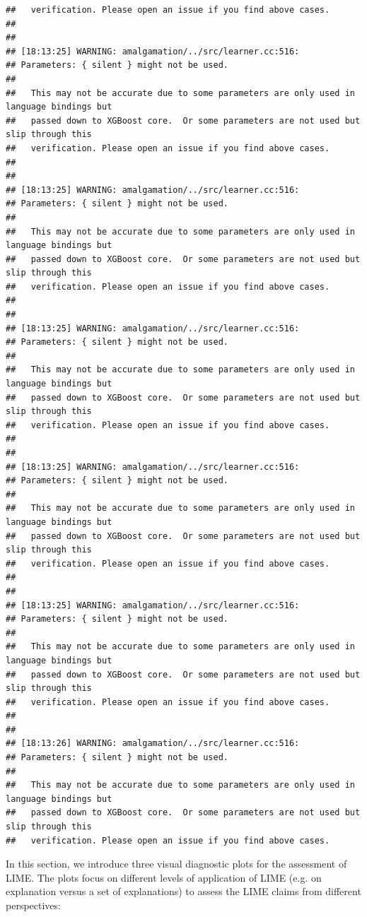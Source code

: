 \documentclass[AMS,STIX2COL]{WileyNJD-v2}\usepackage[]{graphicx}\usepackage[]{color}
\makeatletter
\newenvironment{kframe}{%
 \def\at@end@of@kframe{}%
 \ifinner\ifhmode%
  \def\at@end@of@kframe{\end{minipage}}%
  \begin{minipage}{\columnwidth}%
 \fi\fi%
 \def\FrameCommand##1{\hskip\@totalleftmargin \hskip-\fboxsep
 \colorbox{shadecolor}{##1}\hskip-\fboxsep
     \hskip-\linewidth \hskip-\@totalleftmargin \hskip\columnwidth}%
 \MakeFramed {\advance\hsize-\width
   \@totalleftmargin\z@ \linewidth\hsize
   \@setminipage}}%
 {\par\unskip\endMakeFramed%
 \at@end@of@kframe}
\newenvironment{knitrout}{}{} %
\makeatother
\begin{document}
\begin{knitrout}
\begin{kframe}
\begin{verbatim}
##   verification. Please open an issue if you find above cases.
## 
## 
## [18:13:25] WARNING: amalgamation/../src/learner.cc:516: 
## Parameters: { silent } might not be used.
## 
##   This may not be accurate due to some parameters are only used in language bindings but
##   passed down to XGBoost core.  Or some parameters are not used but slip through this
##   verification. Please open an issue if you find above cases.
## 
## 
## [18:13:25] WARNING: amalgamation/../src/learner.cc:516: 
## Parameters: { silent } might not be used.
## 
##   This may not be accurate due to some parameters are only used in language bindings but
##   passed down to XGBoost core.  Or some parameters are not used but slip through this
##   verification. Please open an issue if you find above cases.
## 
## 
## [18:13:25] WARNING: amalgamation/../src/learner.cc:516: 
## Parameters: { silent } might not be used.
## 
##   This may not be accurate due to some parameters are only used in language bindings but
##   passed down to XGBoost core.  Or some parameters are not used but slip through this
##   verification. Please open an issue if you find above cases.
## 
## 
## [18:13:25] WARNING: amalgamation/../src/learner.cc:516: 
## Parameters: { silent } might not be used.
## 
##   This may not be accurate due to some parameters are only used in language bindings but
##   passed down to XGBoost core.  Or some parameters are not used but slip through this
##   verification. Please open an issue if you find above cases.
## 
## 
## [18:13:25] WARNING: amalgamation/../src/learner.cc:516: 
## Parameters: { silent } might not be used.
## 
##   This may not be accurate due to some parameters are only used in language bindings but
##   passed down to XGBoost core.  Or some parameters are not used but slip through this
##   verification. Please open an issue if you find above cases.
## 
## 
## [18:13:26] WARNING: amalgamation/../src/learner.cc:516: 
## Parameters: { silent } might not be used.
## 
##   This may not be accurate due to some parameters are only used in language bindings but
##   passed down to XGBoost core.  Or some parameters are not used but slip through this
##   verification. Please open an issue if you find above cases.
\end{verbatim}
\end{kframe}
\end{knitrout}



In this section, we introduce three visual diagnostic plots for the assessment of LIME. The plots focus on different levels of application of LIME (e.g. on explanation versus a set of explanations) to assess the LIME claims from different perspectives:
\end{document}
